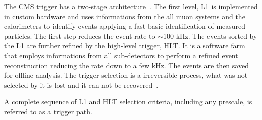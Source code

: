 The CMS trigger has a two-stage architecture~\cite{Khachatryan_2017}. The first level, L1 is
implemented in custom hardware and uses informations from the 
all muon systems and the calorimeters to identify events applying a fast
basic identification of measured particles. The first step reduces the
event rate to $\sim$100 kHz. The events sorted by the L1 are further refined by the
high-level trigger, HLT. It is a software farm that employs informations from all sub-detectors to perform a
refined event reconstruction reducing the rate down to a few kHz. The 
events are then saved for offline analysis.
The trigger selection is a irreversible process, what was not selected
by it is lost and it can not be recovered~\cite{Khachatryan_2017}.

A complete sequence of L1
and HLT selection criteria, including any prescale, is referred to
as a trigger path.
